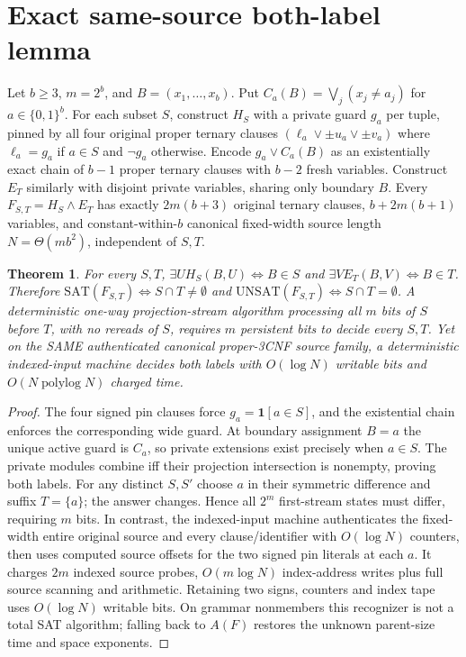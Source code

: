 \documentclass[11pt]{article}
\newtheorem{theorem}{Theorem}
\begin{document}
\section{Exact same-source both-label lemma}
Let $b\ge3$, $m=2^b$, and $B=(x_1,\dots,x_b)$. Put $C_a(B)=\bigvee_j(x_j\ne a_j)$ for $a\in\{0,1\}^b$. For each subset $S$, construct $H_S$ with a private guard $g_a$ per tuple, pinned by all four original proper ternary clauses $(\ell_a\vee\pm u_a\vee\pm v_a)$ where $\ell_a=g_a$ if $a\in S$ and $\neg g_a$ otherwise. Encode $g_a\vee C_a(B)$ as an existentially exact chain of $b-1$ proper ternary clauses with $b-2$ fresh variables. Construct $E_T$ similarly with disjoint private variables, sharing only boundary $B$. Every $F_{S,T}=H_S\wedge E_T$ has exactly $2m(b+3)$ original ternary clauses, $b+2m(b+1)$ variables, and constant-within-$b$ canonical fixed-width source length $N=\Theta(mb^2)$, independent of $S,T$.
\begin{theorem}
For every $S,T$, $\exists U H_S(B,U)\iff B\in S$ and $\exists V E_T(B,V)\iff B\in T$. Therefore $\mathrm{SAT}(F_{S,T})\iff S\cap T\ne\emptyset$ and $\mathrm{UNSAT}(F_{S,T})\iff S\cap T=\emptyset$. A deterministic one-way projection-stream algorithm processing all $m$ bits of $S$ before $T$, with no rereads of $S$, requires $m$ persistent bits to decide every $S,T$. Yet on the SAME authenticated canonical proper-3CNF source family, a deterministic indexed-input machine decides both labels with $O(\log N)$ writable bits and $O(N\operatorname{polylog}N)$ charged time.
\end{theorem}
\begin{proof}
The four signed pin clauses force $g_a=\mathbf 1[a\in S]$, and the existential chain enforces the corresponding wide guard. At boundary assignment $B=a$ the unique active guard is $C_a$, so private extensions exist precisely when $a\in S$. The private modules combine iff their projection intersection is nonempty, proving both labels. For any distinct $S,S'$ choose $a$ in their symmetric difference and suffix $T=\{a\}$; the answer changes. Hence all $2^m$ first-stream states must differ, requiring $m$ bits. In contrast, the indexed-input machine authenticates the fixed-width entire original source and every clause/identifier with $O(\log N)$ counters, then uses computed source offsets for the two signed pin literals at each $a$. It charges $2m$ indexed source probes, $O(m\log N)$ index-address writes plus full source scanning and arithmetic. Retaining two signs, counters and index tape uses $O(\log N)$ writable bits. On grammar nonmembers this recognizer is not a total SAT algorithm; falling back to $A(F)$ restores the unknown parent-size time and space exponents.
\end{proof}
\end{document}
